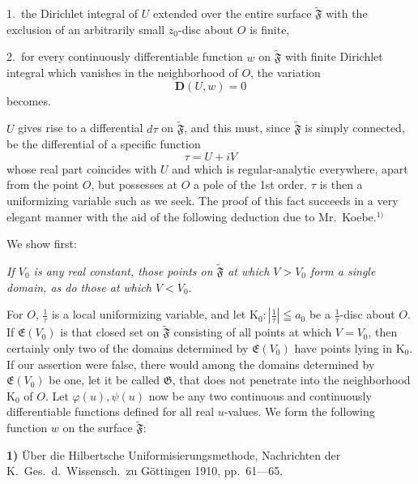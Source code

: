 \documentclass{article}
\begin{document}
1.\ the Dirichlet integral of $U$ extended over the entire surface $\widetilde{\mathfrak{F}}$ with the exclusion of an arbitrarily small $z_0$-disc about $O$ is finite,

2.\ for every continuously differentiable function $w$ on $\widetilde{\mathfrak{F}}$ with finite Dirichlet integral which vanishes in the neighborhood of $O$, the variation
\[ \mathbf{D}(U, w) = 0 \]
becomes.

$U$ gives rise to a differential $d\tau$ on $\widetilde{\mathfrak{F}}$, and this must, since $\widetilde{\mathfrak{F}}$ is simply connected, be the differential of a specific function
\[ \tau = U + iV \]
whose real part coincides with $U$ and which is regular-analytic everywhere, apart from the point $O$, but possesses at $O$ a pole of the 1st order. $\tau$ is then a uniformizing variable such as we seek. The proof of this fact succeeds in a very elegant manner with the aid of the following deduction due to Mr.~Koebe.${}^{1)}$

We show first:

\emph{If $V_0$ is any real constant, those points on $\widetilde{\mathfrak{F}}$ at which $V > V_0$ form a single domain, as do those at which $V < V_0$.}

For $O$, $\frac{1}{\tau}$ is a local uniformizing variable, and let $\mathrm{K}_0 \colon \left|\frac{1}{\tau}\right| \leqq a_0$ be a $\frac{1}{\tau}$-disc about $O$. If $\mathfrak{E}(V_0)$ is that closed set on $\widetilde{\mathfrak{F}}$ consisting of all points at which $V = V_0$, then certainly only two of the domains determined by $\mathfrak{E}(V_0)$ have points lying in $\mathrm{K}_0$. If our assertion were false, there would among the domains determined by $\mathfrak{E}(V_0)$ be one, let it be called $\mathfrak{G}$, that does not penetrate into the neighborhood $\mathrm{K}_0$ of $O$. Let $\varphi(u), \psi(u)$ now be any two continuous and continuously differentiable functions defined for all real $u$-values. We form the following function $w$ on the surface $\widetilde{\mathfrak{F}}$:

\textbf{1)} Über die Hilbertsche Uniformisierungsmethode, Nachrichten der K.~Ges.\ d.~Wissensch.\ zu Göttingen 1910, pp.~61---65.
\end{document}
